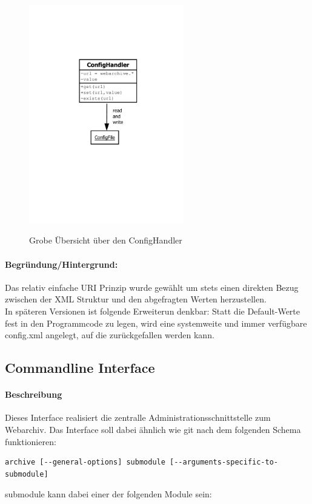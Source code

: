 \begin{figure}[h]
\includegraphics[width=0.6\textwidth]{design/backend/gfx/ConfigHandler.pdf}
\label{sub:confighandler}
\caption{Grobe Übersicht über den ConfigHandler}
\end{figure}

\paragraph{Begründung/Hintergrund:}
\label{par:begr_ndung}
Das relativ einfache URI Prinzip wurde gewählt um stets einen direkten
Bezug zwischen der XML Struktur und den abgefragten Werten herzustellen.
\\
In späteren Versionen ist folgende Erweiterun denkbar: Statt die
Default-Werte fest in den Programmcode zu legen, wird eine systemweite
und immer verfügbare config.xml angelegt, auf die zurückgefallen werden
kann.

\newpage
\subsection{Commandline Interface}
\label{sub:commandline_interface}
\paragraph{Beschreibung}
\label{par:beschreibung}
Dieses Interface realisiert die zentralle Administrationsschnittstelle zum Webarchiv. 
Das Interface soll dabei ähnlich wie git nach dem folgenden Schema funktionieren:
\begin{verbatim}
archive [--general-options] submodule [--arguments-specific-to-submodule]
\end{verbatim}
submodule kann dabei einer der folgenden Module sein:

